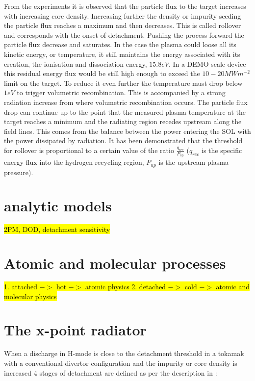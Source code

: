 From the experiments it is observed that the particle flux to the target increases with increasing core density. Increasing further the density or impurity seeding the particle flux reaches a maximum and then decreases. This is called rollover and corresponds with the onset of detachment. Pushing the process forward the particle flux decrease and saturates. In the case the plasma could loose all its kinetic energy, or temperature, it still maintains the energy associated with its creation, the ionisation and dissociation energy, $15.8eV$. In a DEMO scale device this residual energy flux would be still high enough to exceed the $10-20 MWm^{-2}$ limit on the target. \cite{Krasheninnikov2017a} To reduce it even further the temperature must drop below $1eV$ to trigger volumetric recombination. This is accompanied by a strong radiation increase from where volumetric recombination occurs. The particle flux drop can continue up to the point that the measured plasma temperature at the target reaches a minimum and the radiating region recedes upstream along the field lines. This comes from the balance between the power entering the SOL with the power dissipated by radiation. It has been demonstrated that the threshold for rollover is proportional to a certain value of the ratio $ \frac {q_{rec}} {P_{up}}$ ($q_{rec}$ is the speciﬁc energy ﬂux into the hydrogen recycling region, $P_{up}$ is the upstream plasma pressure). \cite{Krasheninnikov1999,Krasheninnikov2016}


\section{analytic models}
\hl{2PM, DOD, detachment sensitivity}
\section{Atomic and molecular processes}
\hl{
            1. attached $->$ hot $->$ atomic physics
            2. detached $->$ cold $->$ atomic and molecular physics}
\section{The x-point radiator}

When a discharge in H-mode is close to the detachment threshold in a tokamak with a conventional divertor configuration and the impurity or core density is increased 4 stages of detachment are defined as per the description in \cite{Reimold2015}:

